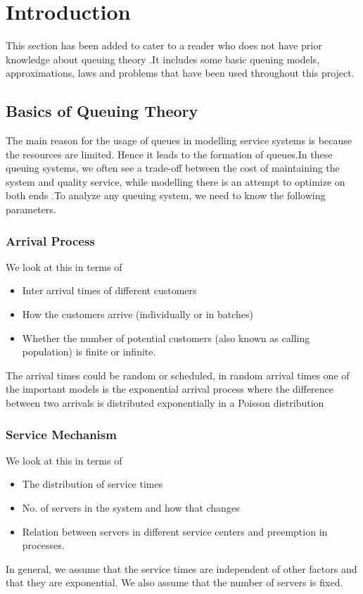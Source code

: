 \chapter{Introduction}

This section has been added to cater to a reader who does not have prior knowledge about queuing theory .It includes some basic queuing models, approximations, laws and problems that have been used throughout this project.



\section{Basics of Queuing Theory}

The main reason for the usage of queues in modelling service systems is because the resources are limited. Hence it leads to the formation of queues.In these queuing systems, we often see a trade-off between the cost of maintaining the system and quality service, while modelling there is an attempt to optimize on both ends .To analyze any queuing system, we need to know the following parameters.
\newpage
\subsection{Arrival Process}
 We look at this in terms of 
 \begin{itemize}
 \item Inter arrival times of different customers
\item How the customers arrive (individually or in batches)
\item  Whether the number of potential customers (also known as calling population) is finite or infinite.
\end{itemize}
 The arrival times could be random or scheduled, in random arrival times one of the important models is the exponential arrival process where the difference between two arrivals is distributed exponentially in a Poisson distribution 
\subsection{Service Mechanism}
We look at this in terms of
\begin{itemize}
    \item The distribution of service times
    \item No. of servers in the system and how that changes 
    \item Relation between servers in different service centers and preemption in processes.
\end{itemize}
In general, we assume that the service times are independent of other factors and that they are exponential. We also assume that the number of servers is fixed. 
\newpage
